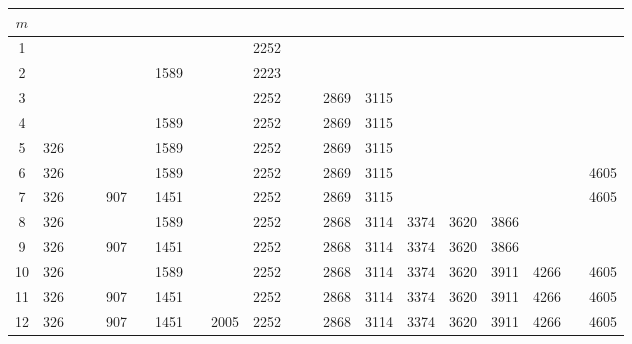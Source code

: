 \begin{landscape}
        \begin{table}
            \centering
            \begin{tabular}{|c|ccccccccccccccccccc|}\hline
                $m$  &      &     &     &     &      &      &      &      &      &      &      &      &      &      &      &      &      &      &      \\\hline
                1  &       &     &     &      &      &      &      &      & 2252 &      &      &      &      &      &      &      &      &      &     \\
                2  &       &     &     &      &      & 1589 &      &      & 2223 &      &      &      &      &      &      &      &      &      &     \\
                3  &       &     &     &      &      &      &      &      & 2252 &      &      & 2869 & 3115 &      &      &      &      &      &     \\
                4  &       &     &     &      &      & 1589 &      &      & 2252 &      &      & 2869 & 3115 &      &      &      &      &      &     \\
                5  &   326 &     &     &      &      & 1589 &      &      & 2252 &      &      & 2869 & 3115 &      &      &      &      &      &     \\
                6  &   326 &     &     &      &      & 1589 &      &      & 2252 &      &      & 2869 & 3115 &      &      &      &      &      & 4605\\
                7  &   326 &     &     & 907  &      & 1451 &      &      & 2252 &      &      & 2869 & 3115 &      &      &      &      &      & 4605\\
                8  &   326 &     &     &      &      & 1589 &      &      & 2252 &      &      & 2868 & 3114 & 3374 & 3620 & 3866 &      &      &     \\
                9  &   326 &     &     & 907  &      & 1451 &      &      & 2252 &      &      & 2868 & 3114 & 3374 & 3620 & 3866 &      &      &     \\
                10 &   326 &     &     &      &      & 1589 &      &      & 2252 &      &      & 2868 & 3114 & 3374 & 3620 & 3911 & 4266 &      & 4605\\
                11 &   326 &     &     & 907  &      & 1451 &      &      & 2252 &      &      & 2868 & 3114 & 3374 & 3620 & 3911 & 4266 &      & 4605\\
                12 &   326 &     &     & 907  &      & 1451 &      & 2005 & 2252 &      &      & 2868 & 3114 & 3374 & 3620 & 3911 & 4266 &      & 4605\\

\end{tabular}
\end{table}
\end{landscape}
